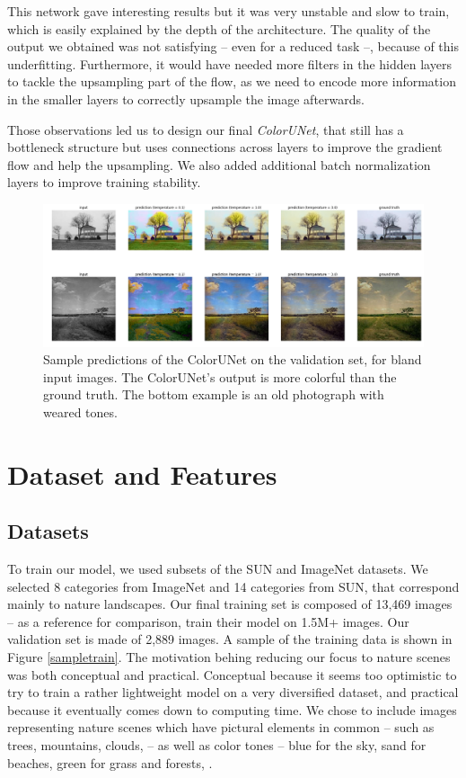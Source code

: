 \documentclass[10pt,twocolumn,letterpaper]{article}
\begin{document}
This network gave interesting results but it was very unstable and slow to train, which is easily explained by the depth of the architecture. The quality of the output we obtained was not satisfying -- even for a reduced task --, because of this underfitting. Furthermore, it would have needed more filters in the hidden layers to tackle the upsampling part of the flow, as we need to encode more information in the smaller layers to correctly upsample the image afterwards.

Those observations led us to design our final \textit{ColorUNet}, that still has a bottleneck structure but uses connections across layers to improve the gradient flow and help the upsampling. We also added additional batch normalization layers to improve training stability.

\begin{figure}
\begin{center}
\includegraphics[width=450px]{better}
\caption{Sample predictions of the ColorUNet on the validation set, for bland input images. The ColorUNet's output is more colorful than the ground truth. The bottom example is an old photograph with weared tones.}
\label{better}
\end{center}
\end{figure}

\section{Dataset and Features}

\subsection{Datasets}

To train our model, we used subsets of the SUN \cite{xiao2010sun} and ImageNet \cite{russakovsky2015imagenet} datasets. We selected 8 categories from ImageNet and 14 categories from SUN, that correspond mainly to nature landscapes. Our final training set is composed of 13,469 images -- as a reference for comparison, \cite{zhang2016colorful} train their model on 1.5M+ images. Our validation set is made of 2,889 images. A sample of the training data is shown in Figure \ref{sampletrain}.
The motivation behing reducing our focus to nature scenes was both conceptual and practical. Conceptual because it seems too optimistic to try to train a rather lightweight model on a very diversified dataset, and practical because it eventually comes down to computing time. We chose to include images representing nature scenes which have pictural elements in common -- such as trees, mountains, clouds, \etc -- as well as color tones -- blue for the sky, sand for beaches, green for grass and forests,  \etc .
\end{document}
